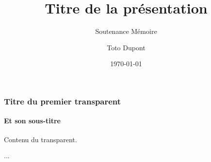\documentclass{beamer}
\title[Présentation]{Titre de la présentation}
\subtitle[\ldots]{Soutenance Mémoire}
\author[Dupont]{Toto Dupont}
\institute[Paris X]{Paris X Nanterre}
\date{\today}
\begin{document}
\maketitle

\begin{frame} %
\frametitle{Titre du premier transparent}
\framesubtitle{Et son sous-titre}

Contenu du transparent.

\end{frame}

\begin{frame} %
...
\end{frame}
\end{document}
